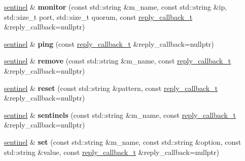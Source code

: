 \begin{DoxyCompactItemize}
\mbox{\hyperlink{classcpp__redis_1_1sentinel}{sentinel}} \& {\bfseries monitor} (const std\+::string \&m_name, const std\+::string \&ip, std\+::size\+\_\+t port, std\+::size\+\_\+t quorum, const \mbox{\hyperlink{classcpp__redis_1_1sentinel_ae1a150ff8787208c47414397a061c9a7}{reply\+\_\+callback\+\_\+t}} \&reply\+\_\+callback=nullptr)
\item 
\mbox{\label{classcpp__redis_1_1sentinel_aba0190b2773d4d1f8d5e4c5aac22ce19}} 
\mbox{\hyperlink{classcpp__redis_1_1sentinel}{sentinel}} \& {\bfseries ping} (const \mbox{\hyperlink{classcpp__redis_1_1sentinel_ae1a150ff8787208c47414397a061c9a7}{reply\+\_\+callback\+\_\+t}} \&reply\+\_\+callback=nullptr)
\item 
\mbox{\label{classcpp__redis_1_1sentinel_aee344f7f63bc02d13cb9dce08d48d5d9}} 
\mbox{\hyperlink{classcpp__redis_1_1sentinel}{sentinel}} \& {\bfseries remove} (const std\+::string \&m_name, const \mbox{\hyperlink{classcpp__redis_1_1sentinel_ae1a150ff8787208c47414397a061c9a7}{reply\+\_\+callback\+\_\+t}} \&reply\+\_\+callback=nullptr)
\item 
\mbox{\label{classcpp__redis_1_1sentinel_a11d5f170474aa881df3b6f3cbbde3569}} 
\mbox{\hyperlink{classcpp__redis_1_1sentinel}{sentinel}} \& {\bfseries reset} (const std\+::string \&pattern, const \mbox{\hyperlink{classcpp__redis_1_1sentinel_ae1a150ff8787208c47414397a061c9a7}{reply\+\_\+callback\+\_\+t}} \&reply\+\_\+callback=nullptr)
\item 
\mbox{\label{classcpp__redis_1_1sentinel_a38436712626f27867ecff225eed87a7f}} 
\mbox{\hyperlink{classcpp__redis_1_1sentinel}{sentinel}} \& {\bfseries sentinels} (const std\+::string \&m_name, const \mbox{\hyperlink{classcpp__redis_1_1sentinel_ae1a150ff8787208c47414397a061c9a7}{reply\+\_\+callback\+\_\+t}} \&reply\+\_\+callback=nullptr)
\item 
\mbox{\label{classcpp__redis_1_1sentinel_a1579c9c9b8ac3cded0a7d70e709e5e1b}} 
\mbox{\hyperlink{classcpp__redis_1_1sentinel}{sentinel}} \& {\bfseries set} (const std\+::string \&m_name, const std\+::string \&option, const std\+::string \&value, const \mbox{\hyperlink{classcpp__redis_1_1sentinel_ae1a150ff8787208c47414397a061c9a7}{reply\+\_\+callback\+\_\+t}} \&reply\+\_\+callback=nullptr)

\end{DoxyCompactItemize}
